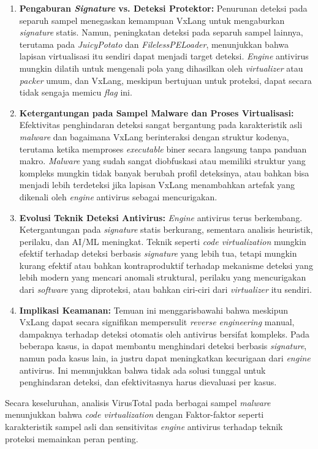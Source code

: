 \begin{enumerate}
    \item \textbf{Pengaburan \textit{Signature} vs. Deteksi Protektor:} Penurunan deteksi pada separuh sampel menegaskan kemampuan VxLang untuk mengaburkan \textit{signature} statis. Namun, peningkatan deteksi pada separuh sampel lainnya, terutama pada \textit{JuicyPotato} dan \textit{FilelessPELoader}, menunjukkan bahwa lapisan virtualisasi itu sendiri dapat menjadi target deteksi. \textit{Engine} antivirus mungkin dilatih untuk mengenali pola yang dihasilkan oleh \textit{virtualizer} atau \textit{packer} umum, dan VxLang, meskipun bertujuan untuk proteksi, dapat secara tidak sengaja memicu \textit{flag} ini.
    \item \textbf{Ketergantungan pada Sampel Malware dan Proses Virtualisasi:} Efektivitas penghindaran deteksi sangat bergantung pada karakteristik asli \textit{malware} dan bagaimana VxLang berinteraksi dengan struktur kodenya, terutama ketika memproses \textit{executable} biner secara langsung tanpa panduan makro. \textit{Malware} yang sudah sangat diobfuskasi atau memiliki struktur yang kompleks mungkin tidak banyak berubah profil deteksinya, atau bahkan bisa menjadi lebih terdeteksi jika lapisan VxLang menambahkan artefak yang dikenali oleh \textit{engine} antivirus sebagai mencurigakan.
    \item \textbf{Evolusi Teknik Deteksi Antivirus:} \textit{Engine} antivirus terus berkembang. Ketergantungan pada \textit{signature} statis berkurang, sementara analisis heuristik, perilaku, dan AI/ML meningkat. Teknik seperti \textit{code virtualization} mungkin efektif terhadap deteksi berbasis \textit{signature} yang lebih tua, tetapi mungkin kurang efektif atau bahkan kontraproduktif terhadap mekanisme deteksi yang lebih modern yang mencari anomali struktural, perilaku yang mencurigakan dari \textit{software} yang diproteksi, atau bahkan ciri-ciri dari \textit{virtualizer} itu sendiri.
    \item \textbf{Implikasi Keamanan:} Temuan ini menggarisbawahi bahwa meskipun VxLang dapat secara signifikan mempersulit \textit{reverse engineering} manual, dampaknya terhadap deteksi otomatis oleh antivirus bersifat kompleks. Pada beberapa kasus, ia dapat membantu menghindari deteksi berbasis \textit{signature}, namun pada kasus lain, ia justru dapat meningkatkan kecurigaan dari \textit{engine} antivirus. Ini menunjukkan bahwa tidak ada solusi tunggal untuk penghindaran deteksi, dan efektivitasnya harus dievaluasi per kasus.
\end{enumerate}
Secara keseluruhan, analisis VirusTotal pada berbagai sampel \textit{malware} menunjukkan bahwa \textit{code virtualization} dengan  Faktor-faktor seperti karakteristik sampel asli dan sensitivitas \textit{engine} antivirus terhadap teknik proteksi memainkan peran penting.
